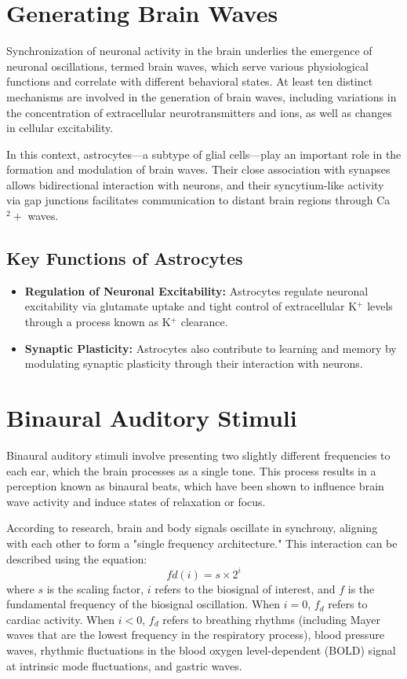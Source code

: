 \documentclass{article}
\begin{document}
\section{Generating Brain Waves}
Synchronization of neuronal activity in the brain underlies the emergence of neuronal oscillations, termed brain waves, which serve various physiological functions and correlate with different behavioral states. At least ten distinct mechanisms are involved in the generation of brain waves, including variations in the concentration of extracellular neurotransmitters and ions, as well as changes in cellular excitability.

In this context, astrocytes—a subtype of glial cells—play an important role in the formation and modulation of brain waves. Their close association with synapses allows bidirectional interaction with neurons, and their syncytium-like activity via gap junctions facilitates communication to distant brain regions through Ca\(^2+\) waves.

\subsection{Key Functions of Astrocytes}
\begin{itemize}
    \item \textbf{Regulation of Neuronal Excitability:} Astrocytes regulate neuronal excitability via glutamate uptake and tight control of extracellular K\(^+\) levels through a process known as K\(^+\) clearance.
    \item \textbf{Synaptic Plasticity:} Astrocytes also contribute to learning and memory by modulating synaptic plasticity through their interaction with neurons.
\end{itemize}

\section{Binaural Auditory Stimuli}
Binaural auditory stimuli involve presenting two slightly different frequencies to each ear, which the brain processes as a single tone. This process results in a perception known as binaural beats, which have been shown to influence brain wave activity and induce states of relaxation or focus.

According to research, brain and body signals oscillate in synchrony, aligning with each other to form a "single frequency architecture." This interaction can be described using the equation:
\[
fd(i) = s \times 2^i
\]
where $s$ is the scaling factor, $i$ refers to the biosignal of interest, and $f$ is the fundamental frequency of the biosignal oscillation. When $i = 0$, $f_d$ refers to cardiac activity. When $i < 0$, $f_d$ refers to breathing rhythms (including Mayer waves that are the lowest frequency in the respiratory process), blood pressure waves, rhythmic fluctuations in the blood oxygen level-dependent (BOLD) signal at intrinsic mode fluctuations, and gastric waves. 
\end{document}
